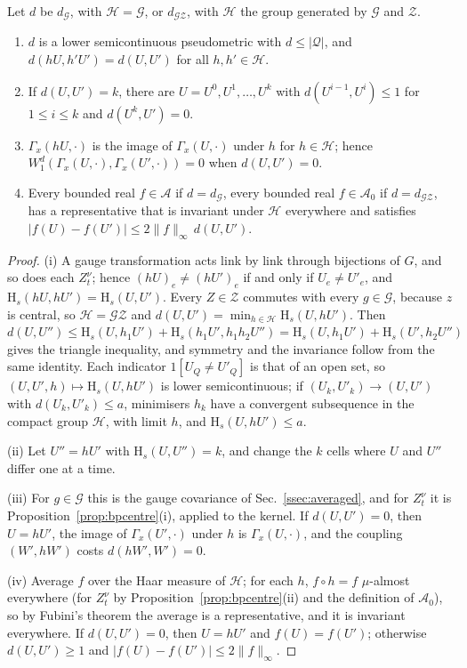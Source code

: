 \begin{lemma}\label{rW9:pseudo}
Let $d$ be $d_{\mathcal G}$, with $\mathcal H=\mathcal G$, or
$d_{\mathcal{GZ}}$, with $\mathcal H$ the group generated by $\mathcal G$ and
$\mathcal Z$.
\begin{enumerate}[label=\textup{(\roman*)},leftmargin=*]
\item $d$ is a lower semicontinuous pseudometric with $d\le\lvert\mathcal
Q\rvert$, and $d(hU,h'U')=d(U,U')$ for all $h,h'\in\mathcal H$.
\item If $d(U,U')=k$, there are $U=U^0,U^1,\dots,U^k$ with $d(U^{i-1},U^i)\le
1$ for $1\le i\le k$ and $d(U^k,U')=0$.
\item $\Gamma_x(hU,\cdot)$ is the image of $\Gamma_x(U,\cdot)$ under $h$ for
$h\in\mathcal H$; hence $W_1^d(\Gamma_x(U,\cdot),\Gamma_x(U',\cdot))=0$
when $d(U,U')=0$.
\item Every bounded real $f\in\mathcal A$ if $d=d_{\mathcal G}$, every bounded
real $f\in\mathcal A_0$ if $d=d_{\mathcal{GZ}}$, has a representative that
is invariant under $\mathcal H$ everywhere and satisfies $\lvert f(U)-f(U')
\rvert\le2\lVert f\rVert_\infty\,d(U,U')$.
\end{enumerate}
\end{lemma}

\begin{proof}
(i) A gauge transformation acts link by link through bijections of $G$, and
so does each $Z^\nu_t$; hence $(hU)_e\ne(hU')_e$ if and only if $U_e\ne
U'_e$, and $\mathrm H_s(hU,hU')=\mathrm H_s(U,U')$. Every $Z\in\mathcal Z$
commutes with every $g\in\mathcal G$, because $z$ is central, so $\mathcal
H=\mathcal G\mathcal Z$ and $d(U,U')=\min_{h\in\mathcal H}\mathrm H_s(U,hU')$.
Then $d(U,U'')\le\mathrm H_s(U,h_1U')+\mathrm H_s(h_1U',h_1h_2U'')=\mathrm
H_s(U,h_1U')+\mathrm H_s(U',h_2U'')$ gives the triangle inequality, and
symmetry and the invariance follow from the same identity. Each indicator
$1[U_Q\ne U'_Q]$ is that of an open set, so $(U,U',h)\mapsto\mathrm H_s(U,
hU')$ is lower semicontinuous; if $(U_k,U'_k)\to(U,U')$ with $d(U_k,U'_k)\le
a$, minimisers $h_k$ have a convergent subsequence in the compact group
$\mathcal H$, with limit $h$, and $\mathrm H_s(U,hU')\le a$.

(ii) Let $U''=hU'$ with $\mathrm H_s(U,U'')=k$, and change the $k$ cells where
$U$ and $U''$ differ one at a time.

(iii) For $g\in\mathcal G$ this is the gauge covariance of
Sec.~\ref{ssec:averaged}, and for $Z^\nu_t$ it is
Proposition~\ref{prop:bpcentre}(i), applied to the kernel. If $d(U,U')=0$,
then $U=hU'$, the image of $\Gamma_x(U',\cdot)$ under $h$ is
$\Gamma_x(U,\cdot)$, and the coupling $(W',hW')$ costs $d(hW',W')=0$.

(iv) Average $f$ over the Haar measure of $\mathcal H$; for each $h$, $f\circ
h=f$ $\mu$-almost everywhere (for $Z^\nu_t$ by
Proposition~\ref{prop:bpcentre}(ii) and the definition of $\mathcal A_0$),
so by Fubini's theorem the average is a representative, and it is invariant
everywhere. If $d(U,U')=0$, then $U=hU'$ and $f(U)=f(U')$; otherwise $d(U,
U')\ge1$ and $\lvert f(U)-f(U')\rvert\le2\lVert f\rVert_\infty$.
\end{proof}

